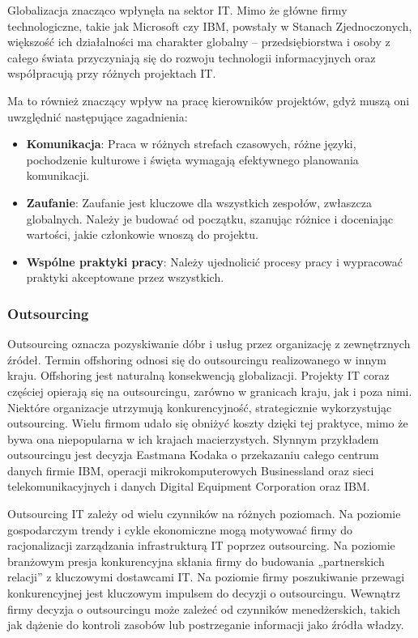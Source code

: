 Globalizacja znacząco wpłynęła na sektor IT. Mimo że główne firmy technologiczne, takie jak Microsoft czy IBM, powstały w Stanach Zjednoczonych, większość ich działalności ma charakter globalny – przedsiębiorstwa i osoby z całego świata przyczyniają się do rozwoju technologii informacyjnych oraz współpracują przy różnych projektach IT.\autocite{ITPM}

Ma to również znaczący wpływ na pracę kierowników projektów, gdyż muszą oni uwzględnić następujące zagadnienia:

\begin{itemize}
  \item \textbf{Komunikacja}:  
  Praca w różnych strefach czasowych, różne języki, pochodzenie kulturowe i święta wymagają efektywnego planowania komunikacji.
  \item \textbf{Zaufanie}:  
  Zaufanie jest kluczowe dla wszystkich zespołów, zwłaszcza globalnych. Należy je budować od początku, szanując różnice i doceniając wartości, jakie członkowie wnoszą do projektu.
  \item \textbf{Wspólne praktyki pracy}:  
  Należy ujednolicić procesy pracy i wypracować praktyki akceptowane przez wszystkich.\autocite{ITPM}
\end{itemize}

\subsubsection{Outsourcing}
Outsourcing oznacza pozyskiwanie dóbr i usług przez organizację z zewnętrznych źródeł. Termin offshoring odnosi się do outsourcingu realizowanego w innym kraju. Offshoring jest naturalną konsekwencją globalizacji. Projekty IT coraz częściej opierają się na outsourcingu, zarówno w granicach kraju, jak i poza nimi.
Niektóre organizacje utrzymują konkurencyjność, strategicznie wykorzystując outsourcing. Wielu firmom udało się obniżyć koszty dzięki tej praktyce, mimo że bywa ona niepopularna w ich krajach macierzystych.\autocite{ITPM}
Słynnym przykładem outsourcingu jest decyzja Eastmana Kodaka o przekazaniu całego centrum danych firmie IBM, operacji mikrokomputerowych Businessland oraz sieci telekomunikacyjnych i danych Digital Equipment Corporation oraz IBM.

Outsourcing IT zależy od wielu czynników na różnych poziomach. Na poziomie gospodarczym trendy i cykle ekonomiczne mogą motywować firmy do racjonalizacji zarządzania infrastrukturą IT poprzez outsourcing. Na poziomie branżowym presja konkurencyjna skłania firmy do budowania „partnerskich relacji” z kluczowymi dostawcami IT. Na poziomie firmy poszukiwanie przewagi konkurencyjnej jest kluczowym impulsem do decyzji o outsourcingu. Wewnątrz firmy decyzja o outsourcingu może zależeć od czynników menedżerskich, takich jak dążenie do kontroli zasobów lub postrzeganie informacji jako źródła władzy.\autocite{loh1992determinants}\autocite{Kanter1979}\autocite{Mintzberg1983}
 

